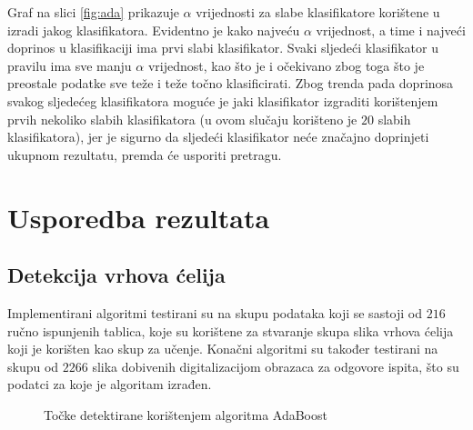 \documentclass[times, utf8, zavrsni, numeric]{fer}
\begin{document}
Graf na slici \ref{fig:ada} prikazuje $\alpha$ vrijednosti za slabe klasifikatore korištene u izradi jakog klasifikatora. 
Evidentno je kako najveću $\alpha$ vrijednost, a time i najveći doprinos u klasifikaciji ima prvi slabi klasifikator. 
Svaki sljedeći klasifikator u pravilu ima sve manju $\alpha$ vrijednost, kao što je i očekivano zbog toga što je preostale podatke sve teže i teže točno klasificirati. 
Zbog trenda pada doprinosa svakog sljedećeg klasifikatora moguće je jaki klasifikator izgraditi korištenjem prvih nekoliko slabih klasifikatora (u ovom slučaju korišteno je $20$ slabih klasifikatora), jer je sigurno da sljedeći klasifikator neće značajno doprinjeti ukupnom rezultatu, premda će usporiti pretragu.

\section{Usporedba rezultata}

\subsection{Detekcija vrhova ćelija}
Implementirani algoritmi testirani su na skupu podataka koji se sastoji od $216$ ručno ispunjenih tablica, koje su korištene za stvaranje skupa slika vrhova ćelija koji je korišten kao skup za učenje.
Konačni algoritmi su također testirani na skupu od $2266$ slika dobivenih digitalizacijom obrazaca za odgovore ispita, što su podatci za koje je algoritam izrađen.

\begin{figure}[!ht]
    \centering
    \captionsetup{justification=centering}
    \caption{Točke detektirane korištenjem algoritma AdaBoost}
    \label{fig:adaResult}
\end{figure}
\end{document}
